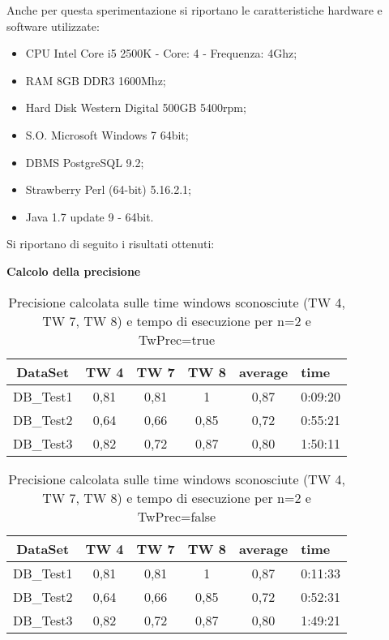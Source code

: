 Anche per questa sperimentazione si riportano le caratteristiche hardware e software utilizzate:
\begin{itemize}
	\item CPU Intel Core i5 2500K - Core: 4 - Frequenza: 4Ghz;
	\item RAM 8GB DDR3 1600Mhz;
	\item Hard Disk Western Digital 500GB 5400rpm;
	\item S.O. Microsoft Windows 7 64bit;
	\item DBMS PostgreSQL 9.2;
	\item Strawberry Perl (64-bit) 5.16.2.1;
	\item Java 1.7 update 9 - 64bit.
\end{itemize}


Si riportano di seguito i risultati ottenuti:

\textbf{Calcolo della precisione}

\begin{table}[H]
	\centering
	\footnotesize
	\begin{tabular}{|cccccp{}|}
	\hline
	\textbf{DataSet} & \textbf{TW 4} & \textbf{ TW 7} & \textbf{TW 8} & \textbf{average} & \textbf{time}\\
	\hline 
	DB\_Test1 & 0,81 & 0,81 & 1 & 0,87 & 0:09:20\\ 
	DB\_Test2 & 0,64 & 0,66 & 0,85 & 0,72 & 0:55:21\\ 
	DB\_Test3 & 0,82 & 0,72 & 0,87 & 0,80 & 1:50:11\\ 
	\hline 
	\end{tabular}
	\caption{Precisione calcolata sulle time windows sconosciute (TW 4, TW 7, TW 8) e tempo di esecuzione per n=2 e TwPrec=true}
\end{table}
\begin{table}[H]
	\centering
	\footnotesize
	\begin{tabular}{|cccccp{}|}
	\hline
	\textbf{DataSet} & \textbf{TW 4} & \textbf{ TW 7} & \textbf{TW 8} & \textbf{average} & \textbf{time}\\
	\hline 
	DB\_Test1 & 0,81 & 0,81 & 1 & 0,87 & 0:11:33\\ 
	DB\_Test2 & 0,64 & 0,66 & 0,85 & 0,72 & 0:52:31\\ 
	DB\_Test3 & 0,82 & 0,72 & 0,87 & 0,80 & 1:49:21\\ 
	\hline 
	\end{tabular}
	\caption{Precisione calcolata sulle time windows sconosciute (TW 4, TW 7, TW 8) e tempo di esecuzione per n=2 e TwPrec=false}
\end{table}

